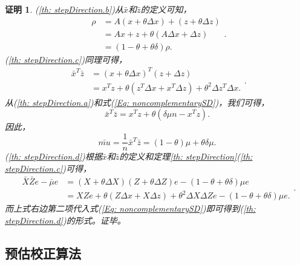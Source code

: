 \documentclass{ctexart}
\numberwithin{equation}{section} %
\newtheorem*{Proof}{证明}
\begin{document}
\begin{Proof}
	(\ref{th: stepDirection.b})从$ \bar{x} $和$ \bar{z} $的定义可知，
	\begin{equation}
		\begin{aligned}
			\rho & = A\left(x + \theta\Delta x\right) + \left(z + \theta\Delta z\right) \\
			& = Ax + z + \theta\left(A\Delta x + \Delta z\right) \\
			& = \left(1 - \theta + \theta\delta\right)\rho.
		\end{aligned}. \nonumber
	\end{equation}
	(\ref{th: stepDirection.c})同理可得，
	\begin{equation}
		\begin{aligned}
			\bar{x}^T\bar{z} & = \left(x + \theta\Delta x\right)^T\left(z + \Delta z\right) \\
			& = x^Tz + \theta\left(z^T\Delta x + x^T\Delta z\right) + {\theta}^2\Delta z^T\Delta x.
		\end{aligned}. \nonumber
	\end{equation}
	从(\ref{th: stepDirection.a})和式(\ref{Eq: noncomplementarySD})，我们可得，
	\begin{equation}
		\bar{x}^T\bar{z} = x^Tz + \theta\left(\delta\mu n - x^Tz\right).  \nonumber
	\end{equation}
	因此，
	\begin{equation}
		\bar{mu} = \frac{1}{n}\bar{x}^T\bar{z} = \left(1 - \theta\right)\mu + \theta\delta\mu.  \nonumber
	\end{equation}
	(\ref{th: stepDirection.d})根据$ \bar{x} $和$ \bar{z} $的定义和定理\ref{th: stepDirection}(\ref{th: stepDirection.c})可得，
	\begin{equation}
		\begin{aligned}
			\bar{X}\bar{Z}e - \bar{\mu}e & = \left(X + \theta\Delta X\right)\left(Z + \theta\Delta Z\right)e - \left(1 - \theta + \theta\delta\right)\mu e \\
			& = XZe + \theta\left(Z\Delta x + X\Delta z\right) + {\theta}^2\Delta X\Delta Ze - \left(1 - \theta + \theta\delta\right)\mu e.
		\end{aligned}. \nonumber
	\end{equation}
	而上式右边第二项代入式(\ref{Eq: noncomplementarySD})即可得到(\ref{th: stepDirection.d})的形式。证毕。
\end{Proof}

\subsection{预估校正算法}
\end{document}
